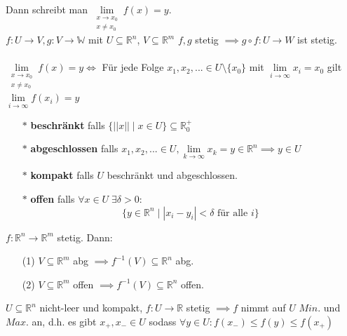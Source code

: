     Dann schreibt man $\lim\limits_{\substack{x\rightarrow x_0\\x\neq x_0}}f(x)=y$.\\
    $f: U\rightarrow V, g: V\rightarrow\mathbb W$ mit $U\subseteq\mathbb R^n$,
    $V\subseteq\mathbb R^m$ $f,g$ stetig $\implies g\circ f:U\rightarrow W$ ist
    stetig.\\\\
    $\lim\limits_{\substack{x\rightarrow x_0\\ x\neq x_0}}f(x)=y\iff$ Für jede
    Folge $x_1,x_2,...\in U\setminus\{x_0\}$ mit
    $\lim\limits_{i\rightarrow\infty} x_i=x_0$ gilt
    $\lim\limits_{i\rightarrow\infty}f(x_i)=y$\\
    \begin{enumerate}
      \item[$*$] \textbf{beschränkt} falls $\{||x||\mid x\in U\}\subseteq\mathbb
        R^+_0$
      \item[$*$] \textbf{abgeschlossen} falls $x_1,x_2,...\in U, 
        \lim\limits_{k\rightarrow\infty}x_k=y\in\mathbb R^n\implies y\in U$
      \item[$*$] \textbf{kompakt} falls $U$ beschränkt und abgeschlossen.
      \item[$*$] \textbf{offen} falls $\forall x\in U\;\exists\delta>0:$
        $$\{y\in\mathbb R^n\mid|x_i-y_i|<\delta\text{ für alle } i\}$$
    \end{enumerate}
    $f:\mathbb R^n\rightarrow\mathbb R^m$ stetig. Dann:
    \begin{enumerate}
      \item[(1)] $V\subseteq\mathbb R^m$ abg $\implies 
        f^{-1}(V)\subseteq\mathbb R^n$ abg.
      \item[(2)] $V\subseteq\mathbb R^m$ offen $\implies
        f^{-1}(V)\subseteq\mathbb R^n$ offen.
    \end{enumerate}
    $U\subseteq\mathbb R^n$ nicht-leer und kompakt, $f:U\rightarrow\mathbb R$
    stetig $\implies f$ nimmt auf $U$ $Min.$ und $Max.$ an, d.h. es gibt
    $x_+,x_-\in U$ sodass $\forall y\in U: f(x_-)\leq f(y)\leq f(x_+)$
